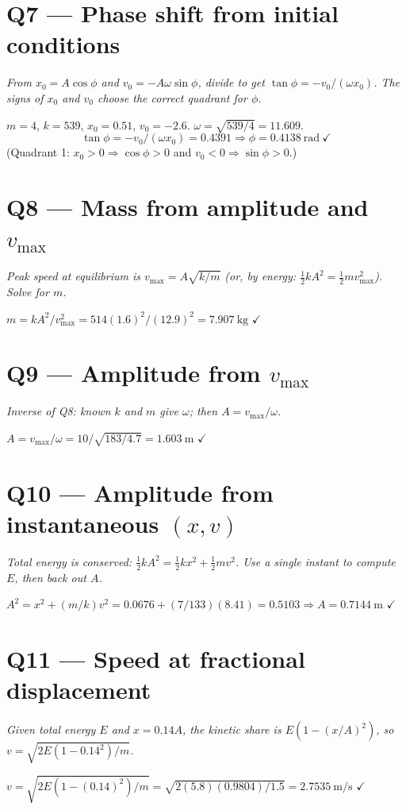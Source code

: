 \documentclass[11pt]{article}
\newcommand{\checkmk}{\ensuremath{\checkmark}}
\begin{document}
\section*{Q7 --- Phase shift from initial conditions}
\emph{From $x_0 = A\cos\phi$ and $v_0 = -A\omega\sin\phi$, divide to get $\tan\phi = -v_0/(\omega x_0)$. The signs of $x_0$ and $v_0$ choose the correct quadrant for $\phi$.}

$m=4$, $k=539$, $x_0=0.51$, $v_0=-2.6$. $\omega = \sqrt{539/4} = 11.609$.
\[ \tan\phi = -v_0/(\omega x_0) = 0.4391 \Rightarrow \phi = \boxed{0.4138\ \text{rad}}\ \checkmk \]
(Quadrant 1: $x_0>0\Rightarrow\cos\phi>0$ and $v_0<0\Rightarrow\sin\phi>0$.)

\section*{Q8 --- Mass from amplitude and $v_{\max}$}
\emph{Peak speed at equilibrium is $v_{\max} = A\sqrt{k/m}$ (or, by energy: $\tfrac12 kA^2 = \tfrac12 m v_{\max}^2$). Solve for $m$.}

$m = kA^2/v_{\max}^2 = 514(1.6)^2/(12.9)^2 = \boxed{7.907\ \text{kg}}$ \checkmk

\section*{Q9 --- Amplitude from $v_{\max}$}
\emph{Inverse of Q8: known $k$ and $m$ give $\omega$; then $A = v_{\max}/\omega$.}

$A = v_{\max}/\omega = 10/\sqrt{183/4.7} = \boxed{1.603\ \text{m}}$ \checkmk

\section*{Q10 --- Amplitude from instantaneous $(x,v)$}
\emph{Total energy is conserved: $\tfrac12 kA^2 = \tfrac12 kx^2 + \tfrac12 mv^2$. Use a single instant to compute $E$, then back out $A$.}

$A^2 = x^2 + (m/k)v^2 = 0.0676 + (7/133)(8.41) = 0.5103 \Rightarrow A = \boxed{0.7144\ \text{m}}$ \checkmk

\section*{Q11 --- Speed at fractional displacement}
\emph{Given total energy $E$ and $x = 0.14A$, the kinetic share is $E(1 - (x/A)^2)$, so $v = \sqrt{2E(1-0.14^2)/m}$.}

$v = \sqrt{2E(1-(0.14)^2)/m} = \sqrt{2(5.8)(0.9804)/1.5} = \boxed{2.7535\ \text{m/s}}$ \checkmk
\end{document}
